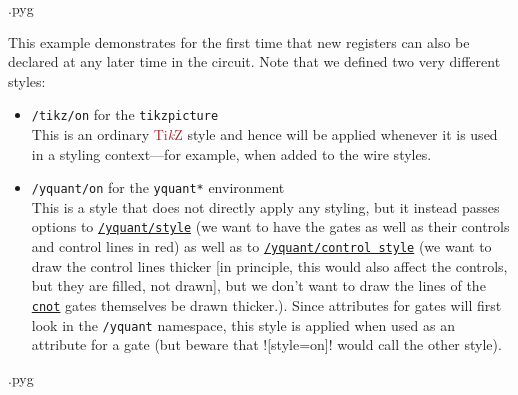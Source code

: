 \documentclass{scrartcl}
\makeatletter
\newenvironment{codeexample}{%
   \VerbatimEnvironment%
   \let\FVB@VerbatimOut\minted@FVB@VerbatimOut
   \let\FVE@VerbatimOut\minted@FVE@VerbatimOut
   \minted@configlang{tex}%
   \minted@fvset
   \begin{VerbatimOut}[codes={\catcode`\^^I=12},firstline,lastline]{\minted@jobname.pyg}%
}{
   \end{VerbatimOut}%
   \minted@langlinenoson%
   \savebox\codeexamplebox{ \minted@jobname.pyg}%
   \ifdim\wd\codeexamplebox>\dimexpr.5\linewidth-3mm\relax%
      \wd\codeexamplebox=.5\linewidth%
   \else%
      \wd\codeexamplebox=\dimexpr\wd\codeexamplebox+3mm\relax%
   \fi%
   \noindent\begin{minipage}{\wd\codeexamplebox}%
      \centering%
      \usebox\codeexamplebox%
   \end{minipage}%
   \begin{minipage}{\dimexpr\linewidth-\wd\codeexamplebox\relax}%
      \expandafter\minted@pygmentize\expandafter{\minted@lang}%
   \end{minipage}%
   \minted@langlinenosoff%
   \par%
}
\def\TikZ{\textcolor{brown}{Ti\textit kZ}}
\def\gate#1{\hyperref[gate:#1]{\texttt{#1}}}
\def\style#1{\hyperref[style:#1]{\texttt{#1}}}
\makeatother
\begin{document}
               \begin{example}
                  \begin{codeexample}
                  \end{codeexample}
                  This example demonstrates for the first time that new registers can also be declared at any later time in the circuit.
                  Note that we defined two very different styles:
                  \begin{itemize}
                     \item \texttt{/tikz/on} for the \texttt{tikzpicture} \\
                        This is an ordinary \TikZ{} style and hence will be applied whenever it is used in a styling context---for example, when added to the wire styles.
                     \item \texttt{/yquant/on} for the \texttt{yquant*} environment \\
                        This is a style that does not directly apply any styling, but it instead passes options to \style{/yquant/style} (we want to have the gates as well as their controls and control lines in red) as well as to \style{/yquant/control style} (we want to draw the control lines thicker [in principle, this would also affect the controls, but they are filled, not drawn], but we don't want to draw the lines of the \gate{cnot} gates themselves be drawn thicker.).
                        Since attributes for gates will first look in the \texttt{/yquant} namespace, this style is applied when used as an attribute for a gate (but beware that \yquant![style=on]! would call the other style).
                  \end{itemize}
               \end{example}

               \begin{example}
                  \begin{codeexample}
                  \end{codeexample}
               \end{example}
\end{document}
